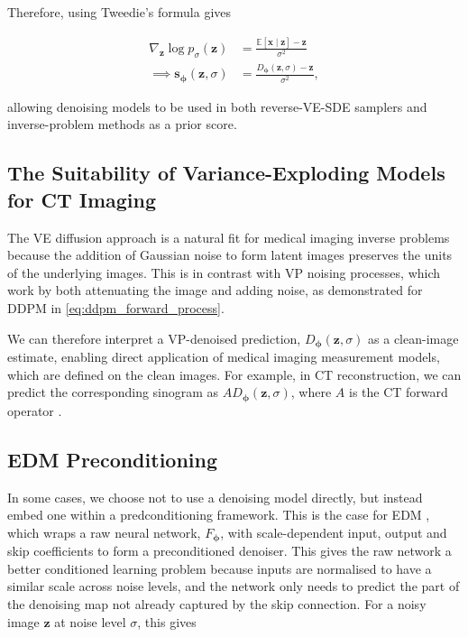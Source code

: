 Therefore, using Tweedie's formula gives

\begin{align}
\nabla_{\mathbf{z}}\log p_\sigma(\mathbf{z})&=
\frac{\mathbb E[\mathbf{x}\mid \mathbf{z}]-\mathbf{z}}{\sigma^2}\\
\implies \mathbf{s}_{\boldsymbol{\phi}}(\mathbf{z},\sigma)&=
\frac{D_{\boldsymbol{\phi}}(\mathbf{z},\sigma)-\mathbf{z}}{\sigma^2},
\label{eq:score_from_denoiser}
\end{align}

allowing denoising models to be used in both reverse-VE-SDE samplers and inverse-problem methods as a prior score.

\subsection{The Suitability of Variance-Exploding Models for CT Imaging}
\label{subsec:suitability_ve_ct}

The VE diffusion approach is a natural fit for medical imaging inverse problems because the addition of Gaussian noise to form latent images preserves the units of the underlying images. This is in contrast with VP noising processes, which work by both attenuating the image and adding noise, as demonstrated for DDPM in \eqref{eq:ddpm_forward_process}. 

We can therefore interpret a VP-denoised prediction, $D_{\boldsymbol{\phi}}(\mathbf{z},\sigma)$ as a clean-image estimate, enabling direct application of medical imaging measurement models, which are defined on the clean images. For example, in CT reconstruction, we can predict the corresponding sinogram as $AD_{\boldsymbol{\phi}}(\mathbf{z},\sigma)$, where $A$ is the CT forward operator \cite{SongMedicalInverse, ChungYeMRI, DPS}.

\subsection{EDM Preconditioning} \label{subsec:edm_preconditioning}

In some cases, we choose not to use a denoising model directly, but instead embed one within a predconditioning framework. This is the case for EDM \cite{Karras_edm}, which wraps a raw neural network, $F_{\boldsymbol{\phi}}$, with scale-dependent input, output and skip coefficients to form a preconditioned denoiser. This gives the raw network a better conditioned learning problem because inputs are normalised to have a similar scale across noise levels, and the network only needs to predict the part of the denoising map not already captured by the skip connection. For a noisy image $\mathbf{z}$ at noise level $\sigma$, this gives

